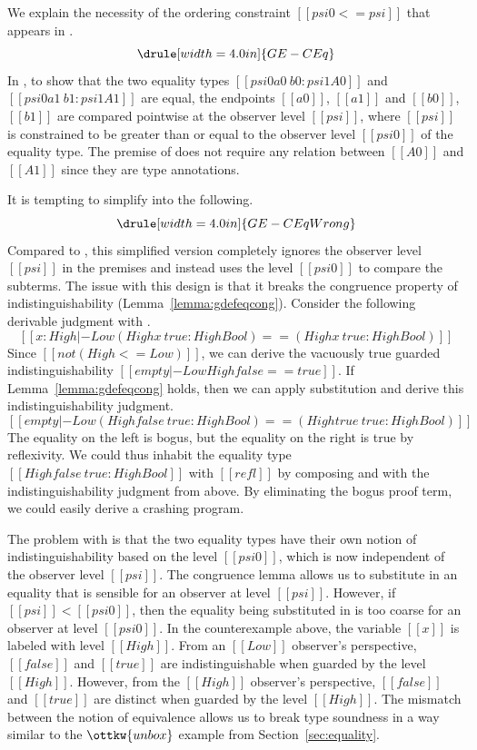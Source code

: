 \documentclass[acmsmall]{acmart}
\begin{document}
We explain the necessity of the ordering constraint
$[[psi0 <= psi]]$ that appears in . %
\[ %
  \drule[width=4.0in]{GE-CEq} \]
In ,
to show that the two equality types $[[psi0 a0 ~ b0 : psi1 A0]]$ and
$[[psi0 a1 ~ b1 : psi1 A1]]$ are equal, the endpoints $[[a0]]$, $[[a1]]$
and $[[b0]]$, $[[b1]]$ are compared pointwise at the observer level $[[psi]]$,
where $[[psi]]$ is constrained to be greater than or equal to the
observer level $[[psi0]]$ of the equality type. The premise of
 does not require any relation between $[[A0]]$ and
$[[A1]]$ since they are type annotations.

It is tempting to
simplify  into the following.
\[\drule[width=4.0in]{GE-CEqWrong}\]
Compared to , this simplified version completely ignores the
observer level $[[psi]]$ %
in the premises and instead uses the level $[[psi0]]$ to compare the subterms.
The issue
with this design is that it breaks the congruence property of
indistinguishability (Lemma~\ref{lemma:gdefeqcong}).
Consider the following derivable judgment with .
\[    [[x : High |- Low (High x ~ true : High Bool) == (High
    x ~ true : High Bool) ]] \]
Since $[[not (High <= Low)]]$, we can derive the vacuously true guarded
indistinguishability $[[empty |- Low High false == true]]$. If
Lemma~\ref{lemma:gdefeqcong} holds, then we can apply substitution and
derive this indistinguishability judgment.
\[ [[empty |- Low (High false ~ true : High Bool) == (High true ~ true : High
  Bool)]] \]
The equality on the left is bogus, but the equality on the right is
true by reflexivity. We could thus
inhabit the equality type $[[High false ~ true : High Bool]]$
with $[[refl]]$ by composing  and  with
the indistinguishability judgment from above. By eliminating the bogus proof term, we could easily
derive a crashing program.

The problem with  is that
the two equality types have their own notion of indistinguishability
based on the level $[[psi0]]$, which is now independent of the observer
level $[[psi]]$. The congruence lemma allows us
to substitute in an equality that is sensible for an observer at level $[[psi]]$.
However, if $[[psi]] < [[psi0]]$, then the equality being
substituted in is too coarse for an observer at level $[[psi0]]$. In
the counterexample above, the variable $[[x]]$ is labeled with level
$[[High]]$. From an $[[Low]]$ observer's perspective, $[[false]]$ and
$[[true]]$ are indistinguishable when guarded by the level
$[[High]]$. However, from the $[[High]]$ observer's perspective,
$[[false]]$ and $[[true]]$ are distinct when guarded by the level
$[[High]]$. The mismatch between the notion of equivalence allows us
to break type soundness in a way similar to the $\ottkw{unbox}$
example from Section~\ref{sec:equality}.
\end{document}
